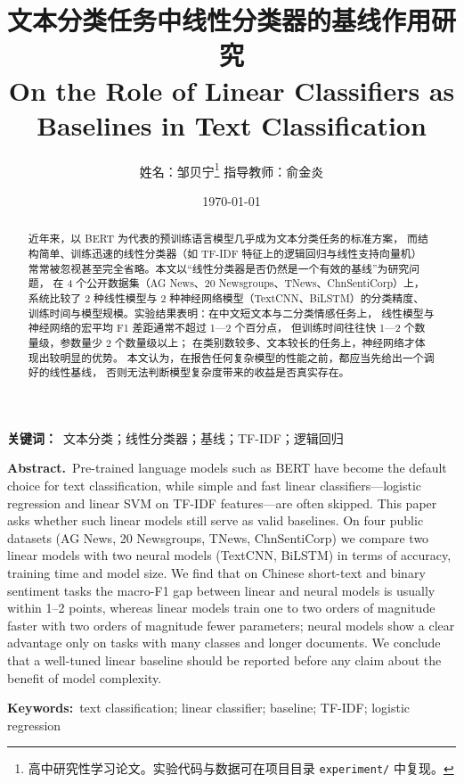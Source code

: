 \documentclass[11pt, a4paper]{ctexart}
\title{\vspace{-1.2cm}\bfseries 文本分类任务中线性分类器的基线作用研究\\
  \large\mdseries On the Role of Linear Classifiers as Baselines in Text Classification}
\author{姓名：邹贝宁\footnote{高中研究性学习论文。实验代码与数据可在项目目录 \texttt{experiment/} 中复现。}\quad
  指导教师：俞金炎}
\date{\today}
\begin{document}
\maketitle
\vspace{-0.8cm}

\begin{abstract}
\noindent
近年来，以 BERT 为代表的预训练语言模型几乎成为文本分类任务的标准方案，
而结构简单、训练迅速的线性分类器（如 TF-IDF 特征上的逻辑回归与线性支持向量机）
常常被忽视甚至完全省略。本文以“线性分类器是否仍然是一个有效的基线”为研究问题，
在 4 个公开数据集（AG News、20 Newsgroups、TNews、ChnSentiCorp）上，
系统比较了 2 种线性模型与 2 种神经网络模型（TextCNN、BiLSTM）的分类精度、
训练时间与模型规模。实验结果表明：在中文短文本与二分类情感任务上，
线性模型与神经网络的宏平均 F1 差距通常不超过 1—2 个百分点，
但训练时间往往快 1—2 个数量级，参数量少 2 个数量级以上；
在类别数较多、文本较长的任务上，神经网络才体现出较明显的优势。
本文认为，在报告任何复杂模型的性能之前，都应当先给出一个调好的线性基线，
否则无法判断模型复杂度带来的收益是否真实存在。
\end{abstract}

\vspace{0.3em}
\noindent\textbf{关键词：}\ 文本分类；线性分类器；基线；TF-IDF；逻辑回归

\vspace{0.6em}
\noindent\textbf{Abstract.}\ 
Pre-trained language models such as BERT have become the default choice for text
classification, while simple and fast linear classifiers---logistic regression and
linear SVM on TF-IDF features---are often skipped. This paper asks whether such
linear models still serve as valid baselines. On four public datasets
(AG News, 20 Newsgroups, TNews, ChnSentiCorp) we compare two linear models with two
neural models (TextCNN, BiLSTM) in terms of accuracy, training time and model size.
We find that on Chinese short-text and binary sentiment tasks the macro-F1 gap
between linear and neural models is usually within 1--2 points, whereas linear models
train one to two orders of magnitude faster with two orders of magnitude fewer
parameters; neural models show a clear advantage only on tasks with many classes and
longer documents. We conclude that a well-tuned linear baseline should be reported
before any claim about the benefit of model complexity.

\vspace{0.4em}
\noindent\textbf{Keywords:}\ text classification; linear classifier; baseline; TF-IDF; logistic regression
\end{document}
